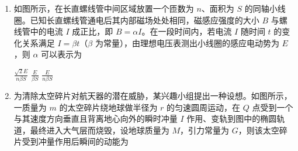 \documentclass[\gkver]{gaokaozhenti}
\begin{document}
\begin{enumerate}
{$\Delta x$ 变大}
{双缝间的距离减小}
{双缝间的距离不变}


\item
如图所示，在长直螺线管中间区域放置一个匝数为 $n$、面积为 $S$ 的同轴小线圈。已知长直螺线管通电后其内部磁场处处相同，磁感应强度的大小 $B$ 与螺线管中的电流 $I$ 成正比，即 $B = \alpha I$。在一段时间内，若电流 $I$ 随时间 $t$ 的变化关系满足 $I = \beta t$（$\beta$ 为常量），由理想电压表测出小线圈的感应电动势为 $E$，则 $\alpha$ 可以表示为

{$\frac{\sqrt{2}E}{n\beta S}$}
{$\frac{E}{\beta S}$}
{$\frac{E}{n\beta S}$}


\item
为清除太空碎片对航天器的潜在威胁，某兴趣小组提出一种设想。如图所示，一质量为 $m$ 的太空碎片绕地球做半径为 $r$ 的匀速圆周运动，在 $Q$ 点受到一个与其速度方向垂直且背离地心向外的瞬时冲量 $I$ 作用、变轨到图中的椭圆轨道，最终进入大气层而烧毁，设地球质量为 $M$，引力常量为 $G$，则该太空碎片受到冲量作用后瞬间的动能为
\onepicture[w=4.0cm, align=right]{}


\end{enumerate}
\end{document}

